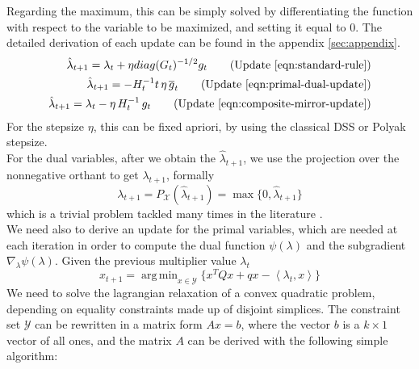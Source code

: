 \documentclass[notitlepage]{article}
\DeclareMathOperator*{\argmin}{arg\,min}
\begin{document}
Regarding the maximum, this can be simply solved by differentiating the function with respect to the variable to be maximized, and setting it equal to $0$. The detailed derivation of each update can be found in the appendix \ref{sec:appendix}.
\begin{subequations}
  \label{eqn:minimized}
  \begin{align}
    \hat{\lambda}_{t+1} = \lambda_t + \eta diag(G_t)^{-1/2} g_t 
    \tag{Update \eqref{eqn:standard-rule}} \\
    \hat{\lambda}_{t+1} = -H_t^{-1} t\, \eta\, \overline{g}_t
    \tag{Update \eqref{eqn:primal-dual-update}} \\
    \hat{\lambda}_{t+1} = \lambda_t - \eta\, H_t^{-1}\, g_t 
    \tag{Update \eqref{eqn:composite-mirror-update}}
  \end{align}
\end{subequations}
For the stepsize $\eta$, this can be fixed apriori, by using the classical DSS or Polyak stepsize.\\
For the dual variables, after we obtain the $\hat{\lambda}_{t+1}$, we use the projection over the nonnegative orthant to get $\lambda_{t+1}$, formally
\[
  \lambda_{t+1} = P_\mathcal{X}(\hat{\lambda}_{t+1}) = \max{ \{ 0,\hat{\lambda}_{t+1} \} }
\]
which is a trivial problem tackled many times in the literature \cite{nonnegative-orthant}.\\
We need also to derive an update for the primal variables, which are needed at each iteration in order to compute the dual function $\psi( \lambda )$ and the subgradient $\nabla_\lambda \psi( \lambda )$. Given the previous multiplier value $\lambda_t$
\[
  x_{t+1} = \argmin_{x \in \mathcal{Y}} \{ x^T Q x + q x - \left\langle \lambda_t,x \right\rangle \}
\]
We need to solve the lagrangian relaxation of a convex quadratic problem, depending on equality constraints made up of disjoint simplices. The constraint set $\mathcal{Y}$ can be rewritten in a matrix form $Ax = b$, where the vector $b$ is a $k \times 1$ vector of all ones, and the matrix $A$
can be derived with the following simple algorithm:
\end{document}
